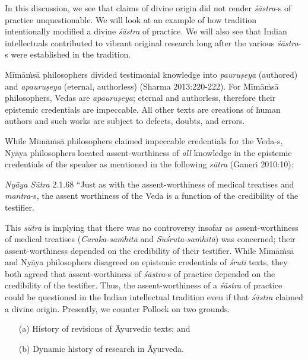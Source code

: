 In this discussion, we see that claims of divine origin did not render {\sl śāstra}-s of practice unquestionable. We will look at an example of how tradition intentionally modified a divine {\sl śāstra} of practice. We will also see that Indian intellectuals contributed to vibrant original research long after the various {\sl śāstra}-s were established in the tradition.

Mīmāṁsā philosophers divided testimonial knowledge into {\sl pauruṣeya} (authored) and {\sl apauruṣeya} (eternal, authorless) (Sharma 2013:220-222). For Mīmāṁsā philosophers, Vedas are {\sl apauruṣeya}; eternal and authorless, therefore their epistemic credentials are impeccable. All other texts are creations of human authors and such works are subject to defects, doubts, and errors.

While Mīmāṁsā philosophers claimed impeccable credentials for the Veda-s, Nyāya philosophers located assent-worthiness of {\sl all} knowledge in the epistemic credentials of the speaker as mentioned in the following {\sl sūtra} (Ganeri 2010:10):
\begin{myquote}
{{\sl Nyāya Sūtra}\relax}  2.1.68 ``Just as with the assent-worthiness of medical treatises and {\sl mantra}-s, the assent worthiness of the Veda is a function of the credibility of the testifier.
\end{myquote}

This {\sl sūtra} is implying that there was no controversy insofar as assent-worthiness of medical treatises ({\sl Caraka-saṁhitā} and {\sl Suśruta-saṁhitā}) was concerned; their assent-worthiness depended on the credibility of their testifier. While Mīmāṁsā and Nyāya philosophers disagreed on epistemic credentials of {\sl śruti} texts, they both agreed that assent-worthiness of {\sl śāstra}-s of practice depended on the credibility of the testifier. Thus, the assent-worthiness of a {\sl śāstra} of practice could be questioned in the Indian intellectual tradition even if that {\sl śāstra} claimed a divine origin. Presently, we counter Pollock on two grounds.
\begin{itemize}
\itemsep=0pt
\item[(a)] History of revisions of Āyurvedic texts; and

\item[(b)] Dynamic history of research in Āyurveda.
\end{itemize}

